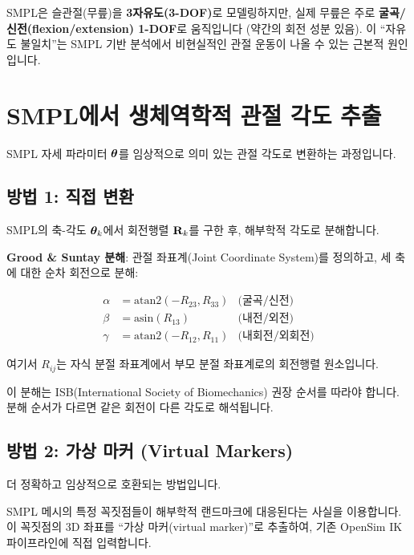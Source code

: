 \documentclass[11pt, a4paper]{report}
\begin{document}
\begin{importantnote}
SMPL은 슬관절(무릎)을 \textbf{3자유도(3-DOF)}로 모델링하지만, 실제 무릎은 주로 \textbf{굴곡/신전(flexion/extension) 1-DOF}로 움직입니다 (약간의 회전 성분 있음). 이 ``자유도 불일치''는 SMPL 기반 분석에서 비현실적인 관절 운동이 나올 수 있는 근본적 원인입니다.
\end{importantnote}


\section{SMPL에서 생체역학적 관절 각도 추출}
\label{sec:joint_angle_extraction}

SMPL 자세 파라미터 $\bm{\theta}$를 임상적으로 의미 있는 관절 각도로 변환하는 과정입니다.

\subsection{방법 1: 직접 변환}

SMPL의 축-각도 $\bm{\theta}_k$에서 회전행렬 $\mathbf{R}_k$를 구한 후, 해부학적 각도로 분해합니다.

\textbf{Grood \& Suntay 분해}: 관절 좌표계(Joint Coordinate System)를 정의하고, 세 축에 대한 순차 회전으로 분해:

\begin{align}
\alpha &= \text{atan2}(-R_{23}, R_{33}) & \text{(굴곡/신전)} \\
\beta &= \text{asin}(R_{13}) & \text{(내전/외전)} \\
\gamma &= \text{atan2}(-R_{12}, R_{11}) & \text{(내회전/외회전)}
\end{align}

여기서 $R_{ij}$는 자식 분절 좌표계에서 부모 분절 좌표계로의 회전행렬 원소입니다.

\begin{remark}
이 분해는 ISB(International Society of Biomechanics) 권장 순서를 따라야 합니다. 분해 순서가 다르면 같은 회전이 다른 각도로 해석됩니다.
\end{remark}

\subsection{방법 2: 가상 마커 (Virtual Markers)}
\label{sec:virtual_markers}

더 정확하고 임상적으로 호환되는 방법입니다.

\begin{keyidea}
SMPL 메시의 특정 꼭짓점들이 해부학적 랜드마크에 대응된다는 사실을 이용합니다. 이 꼭짓점의 3D 좌표를 ``가상 마커(virtual marker)''로 추출하여, 기존 OpenSim IK 파이프라인에 직접 입력합니다.
\end{keyidea}
\end{document}
